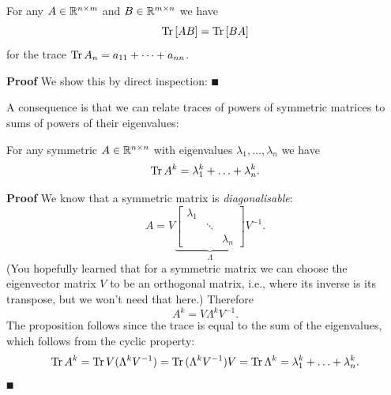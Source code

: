 \begin{proposition} For any $A \in {\mathbb R}^{n \times m}$ and $B \in {\mathbb R}^{m \times n}$ we have
\[
{\rm Tr}\,[A B] = {\rm Tr}\,[B A]
\]
for the trace ${\rm Tr}\, A_n = a_{11} + \cdots + a_{nn}$.

\end{proposition}
\textbf{Proof} We show this by direct inspection:
\ensuremath{\QED}

A consequence is that we can relate traces of powers of symmetric matrices to sums of powers of their eigenvalues:

\begin{proposition} For any symmetric $A \in {\mathbb R}^{n \times n}$ with eigenvalues $\ensuremath{\lambda}_1,\ensuremath{\ldots},\ensuremath{\lambda}_n$ we have
\[
{\rm Tr}\, A^k = \lambda_1^k + \ldots + \lambda_n^k.
\]
\end{proposition}
\textbf{Proof} We know that a symmetric matrix is \emph{diagonalisable}:
\[
A = V \underbrace{\begin{bmatrix} \ensuremath{\lambda}_1 &  &  \\  & \ensuremath{\ddots} &  \\  &  & \ensuremath{\lambda}_n \end{bmatrix}}_{\ensuremath{\Lambda}} V^{-1}.
\]
(You hopefully learned that for a symmetric matrix we can choose the eigenvector matrix $V$ to be an orthogonal matrix, i.e., where its inverse is its transpose, but we won't need that here.) Therefore
\[
A^k = V \ensuremath{\Lambda}^k V^{-1}.
\]
The proposition follows since the trace is equal to the sum of the eigenvalues, which follows from the cyclic property:
\[
{\rm Tr}\, A^k = {\rm Tr}\, V (\Lambda^k V^{-1}) = {\rm Tr}\, (\Lambda^k V^{-1})V = {\rm Tr}\, \Lambda^k = \lambda_1^k + \ldots + \lambda_n^k.
\]
\ensuremath{\QED}

